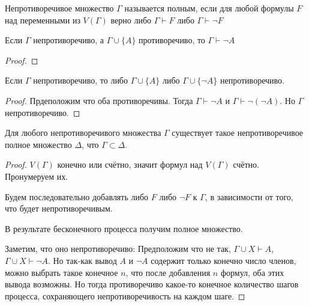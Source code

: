 \begin{definition} \thmslashn 

    Непротиворечивое множество $\Gamma$ называется полным, если для любой формулы $F$ над переменными из $V(\Gamma)$ верно либо $\Gamma \vdash F$ либо $\Gamma \vdash \neg F$
\end{definition}
\begin{lemma} \thmslashn

    Если $\Gamma$ непротиворечиво, а $\Gamma \cup \{A\}$ противоречиво, то $\Gamma \vdash \neg A$
    \begin{proof} \thmslashn
    
    \end{proof}
\end{lemma}
\begin{lemma} \thmslashn

    Если $\Gamma$ непротиворечиво, то либо $\Gamma \cup \{A\} $ либо $\Gamma \cup \{\neg A\} $ непротиворечиво.
    \begin{proof} \thmslashn
    
        Прдеположим что оба противоречивы. Тогда $\Gamma \vdash \neg A$ и $\Gamma \vdash \neg (\neg A)$. Но $\Gamma$ непротиворечиво.
    \end{proof}
\end{lemma}
\begin{lemma} \thmslashn

    Для любого непротиворечивого множества $\Gamma$ существует такое непротиворечивое полное множество $\Delta$, что $\Gamma \subset \Delta$.
    \begin{proof} \thmslashn
    
        $V(\Gamma)$ конечно или счётно, значит формул над $V(\Gamma)$ счётно. Пронумеруем их.

        Будем последовательно добавлять либо $F$ либо $\neg F$ к $\Gamma$, в зависимости от того, что будет непротиворечивым.

        В результате бесконечного процесса получим полное множество.

        Заметим, что оно непротиворечиво: Предположим что не так, $\Gamma \cup X \vdash A$, $\Gamma \cup X \vdash \neg A$. Но так-как вывод $A$ и $\neg A$ содержит только конечно число членов, можно выбрать такое конечное $n$, что после добавления  $n$ формул, оба этих вывода возможны. Но тогда противоречиво какое-то конечное количество шагов процесса, сохраняющего непротиворечивость на каждом шаге.
    \end{proof}
\end{lemma}
